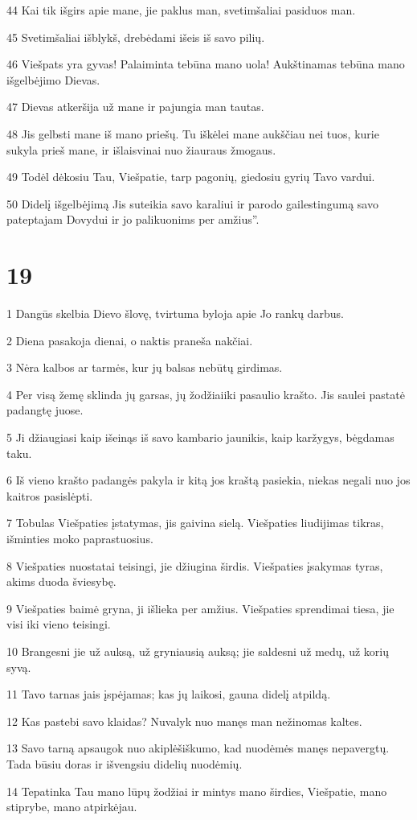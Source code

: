 \par 44 Kai tik išgirs apie mane, jie paklus man, svetimšaliai pasiduos man. 
\par 45 Svetimšaliai išblykš, drebėdami išeis iš savo pilių. 
\par 46 Viešpats yra gyvas! Palaiminta tebūna mano uola! Aukštinamas tebūna mano išgelbėjimo Dievas. 
\par 47 Dievas atkeršija už mane ir pajungia man tautas. 
\par 48 Jis gelbsti mane iš mano priešų. Tu iškėlei mane aukščiau nei tuos, kurie sukyla prieš mane, ir išlaisvinai nuo žiauraus žmogaus. 
\par 49 Todėl dėkosiu Tau, Viešpatie, tarp pagonių, giedosiu gyrių Tavo vardui. 
\par 50 Didelį išgelbėjimą Jis suteikia savo karaliui ir parodo gailestingumą savo pateptajam Dovydui ir jo palikuonims per amžius”.



\chapter{19}


\par 1 Dangūs skelbia Dievo šlovę, tvirtuma byloja apie Jo rankų darbus. 
\par 2 Diena pasakoja dienai, o naktis praneša nakčiai. 
\par 3 Nėra kalbos ar tarmės, kur jų balsas nebūtų girdimas. 
\par 4 Per visą žemę sklinda jų garsas, jų žodžiai­iki pasaulio krašto. Jis saulei pastatė padangtę juose. 
\par 5 Ji džiaugiasi kaip išeinąs iš savo kambario jaunikis, kaip karžygys, bėgdamas taku. 
\par 6 Iš vieno krašto padangės pakyla ir kitą jos kraštą pasiekia, niekas negali nuo jos kaitros pasislėpti. 
\par 7 Tobulas Viešpaties įstatymas, jis gaivina sielą. Viešpaties liudijimas tikras, išminties moko paprastuosius. 
\par 8 Viešpaties nuostatai teisingi, jie džiugina širdis. Viešpaties įsakymas tyras, akims duoda šviesybę. 
\par 9 Viešpaties baimė gryna, ji išlieka per amžius. Viešpaties sprendimai­ tiesa, jie visi iki vieno teisingi. 
\par 10 Brangesni jie už auksą, už gryniausią auksą; jie saldesni už medų, už korių syvą. 
\par 11 Tavo tarnas jais įspėjamas; kas jų laikosi, gauna didelį atpildą. 
\par 12 Kas pastebi savo klaidas? Nuvalyk nuo manęs man nežinomas kaltes. 
\par 13 Savo tarną apsaugok nuo akiplėšiškumo, kad nuodėmės manęs nepavergtų. Tada būsiu doras ir išvengsiu didelių nuodėmių. 
\par 14 Tepatinka Tau mano lūpų žodžiai ir mintys mano širdies, Viešpatie, mano stiprybe, mano atpirkėjau.



